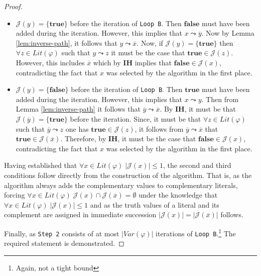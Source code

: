 \documentclass [11pt]{article}
\newcommand{\True}{\mathbf{true}}
\newcommand{\False}{\mathbf{false}}
\newcommand{\var}{\mathit{Var}}
\newcommand{\lit}{\mathit{Lit}}
\newcommand{\reach}{\leadsto}
\begin{document}
\begin{proof}
\begin{itemize}
\begin{itemize}
\begin{center}
\end{center}


\item $\mathcal{J}(y)=\{\True\}$ before the iteration of \texttt{Loop B}. Then $\False$ must have been added during the iteration. However, this implies that $x \reach \overline{y}$. Now by Lemma \ref{lem:inverse-path}, it follows that $y \reach \overline{x}$. Now, if $\mathcal{J}(y)=\{\True\}$ then $\forall z \in \lit(\varphi)$ such that $y\reach z$ it must be the case that $\True \in \mathcal{J}(z)$. However, this includes $\overline{x}$ which by \textbf{IH} implies that $\False \in \mathcal{J}(x)$, contradicting the fact that $x$ was selected by the algorithm in the first place.
\item $\mathcal{J}(y)=\{\False\}$ before the iteration of \texttt{Loop B}. Then $\True$ must have been added during the iteration. However, this implies that $x \reach y$. Then from Lemma \ref{lem:inverse-path} it follows that $\overline{y} \reach \overline{x}$. By \textbf{IH}, it must be that 
$\mathcal{J}(\overline{y})=\{\True\}$ before the iteration. Since, it must be that $\forall z \in \lit(\varphi)$ such that $\overline{y} \reach z$ one has $\True \in \mathcal{J}(z)$, it follows from $\overline{y} \reach \overline{x}$ that $\True \in \mathcal{J}(\overline{x})$. Therefore, by \textbf{IH}, it must be the case that $\False \in \mathcal{J}(x)$, contradicting the fact that $x$ was selected by the algorithm in the first place.
\end{itemize}
Having established that $\forall x\in \lit(\varphi) \; |\mathcal{J}(x)|\leq 1$, the second and third conditions follow directly from the construction of the algorithm. That is, as the algorithm always adds the complementary values to complementary literals, forcing  $\forall x \in \mathit{Lit}(\varphi)\;  \mathcal{J}(x) \cap \mathcal{J}(\overline{x}) = \emptyset$ under the knowledge that $\forall x\in \lit(\varphi) \; |\mathcal{J}(x)|\leq 1$ and as the truth values of a literal and its complement are assigned in immediate succession $|\mathcal{J}(x)| =| \mathcal{J}(\overline{x})|$ follows.
\end{itemize}
Finally, as \texttt{Step 2} consists of at most $|\var(\varphi)|$ iterations of \texttt{Loop B}.\footnote{Again, not a tight bound} The required statement is demonstrated.
\end{proof}
\end{document}

